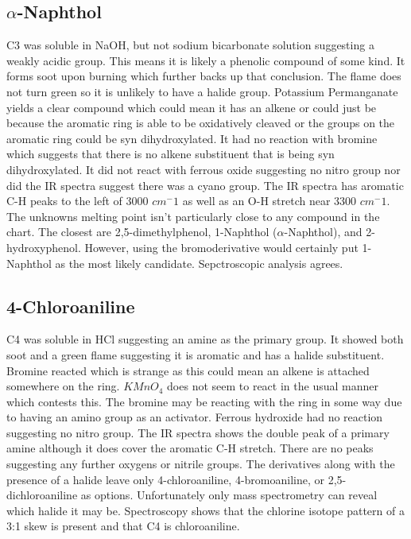 \documentclass{article}
\begin{document}
	\subsection{$\alpha$-Naphthol}
	C3 was soluble in NaOH, but not sodium bicarbonate solution suggesting a weakly acidic group. This means it is likely a phenolic compound of some kind. It forms soot upon burning which further backs up that conclusion. The flame does not turn green so it is unlikely to have a halide group. Potassium Permanganate yields a clear compound which could mean it has an alkene or could just be because the aromatic ring is able to be oxidatively cleaved or the groups on the aromatic ring could be syn dihydroxylated. It had no reaction with bromine which suggests that there is no alkene substituent that is being syn dihydroxylated. It did not react with ferrous oxide suggesting no nitro group nor did the IR spectra suggest there was a cyano group. The IR spectra has aromatic C-H peaks to the left of 3000 $cm^-1$ as well as an O-H stretch near 3300 $cm^-1$. The unknowns melting point isn't particularly close to any compound in the chart. The closest are 2,5-dimethylphenol, 1-Naphthol ($\alpha$-Naphthol), and 2-hydroxyphenol. However, using the bromoderivative would certainly put 1-Naphthol as the most likely candidate. Sepctroscopic analysis agrees.
	
	\subsection{4-Chloroaniline}
	C4 was soluble in HCl suggesting an amine as the primary group. It showed both soot and a green flame suggesting it is aromatic and has a halide substituent. Bromine reacted which is strange as this could mean an alkene is attached somewhere on the ring. $KMnO_4$ does not seem to react in the usual manner which contests this. The bromine may be reacting with the ring in some way due to having an amino group as an activator. Ferrous hydroxide had no reaction suggesting no nitro group. The IR spectra shows the double peak of a primary amine although it does cover the aromatic C-H stretch. There are no peaks suggesting any further oxygens or nitrile groups. The derivatives along with the presence of a halide leave only 4-chloroaniline, 4-bromoaniline, or 2,5-dichloroaniline as options. Unfortunately only mass spectrometry can reveal which halide it may be. Spectroscopy shows that the chlorine isotope pattern of a 3:1 skew is present and that C4 is chloroaniline.
	
\end{document}
